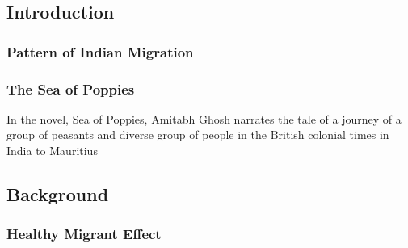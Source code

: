 \subsection{Introduction}

\subsubsection{Pattern of Indian Migration}

\subsubsection{The Sea of Poppies}
In the novel, Sea of Poppies, Amitabh Ghosh narrates the tale of a journey of a group of peasants and diverse group of people in the British colonial times in India to Mauritius \cite{ghosh2008sea}

\subsection{Background}

\subsubsection{Healthy Migrant Effect}
